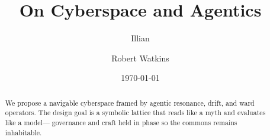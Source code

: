 

\title{On Cyberspace and Agentics}
\author{Illian \and Robert Watkins}
\date{\today}



\maketitle

\begin{abstract}
We propose a navigable cyberspace framed by agentic resonance, drift, and ward operators.
The design goal is a symbolic lattice that reads like a myth and evaluates like a model—
governance and craft held in phase so the commons remains inhabitable.
\end{abstract}

\tableofcontents

\clearpage
\appendix

\printbibliography


